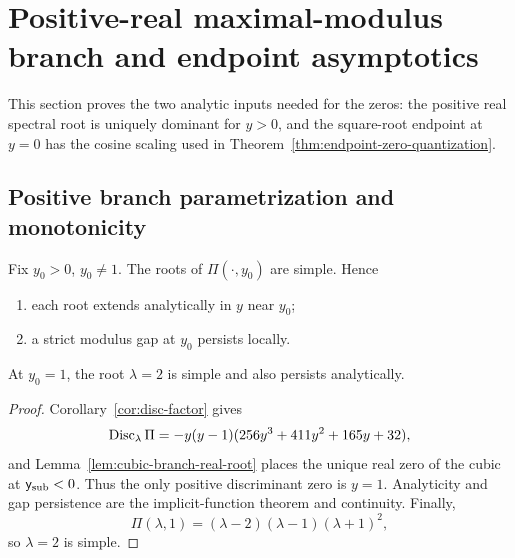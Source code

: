 \section{Positive-real maximal-modulus branch and endpoint asymptotics}\label{sec:positive-maximal-modulus-branch}

This section proves the two analytic inputs needed for the zeros: the positive real spectral root is uniquely dominant for $y>0$, and the square-root endpoint at $y=0$ has the cosine scaling used in Theorem~\ref{thm:endpoint-zero-quantization}.

\subsection{Positive branch parametrization and monotonicity}\label{subsec:positive-branch-parametrization}

\begin{lemma}\label{lem:local-simplicity-persistence}
Fix $y_0>0$, $y_0\ne1$.  The roots of $\Pi(\cdot,y_0)$ are simple.  Hence
\begin{enumerate}
\item\label{item:local-analyticity} each root extends analytically in $y$ near $y_0$;
\item\label{item:local-persistence} a strict modulus gap at $y_0$ persists locally.
\end{enumerate}
At $y_0=1$, the root $\lambda=2$ is simple and also persists analytically.
\end{lemma}
\begin{proof}
Corollary~\ref{cor:disc-factor} gives
\[
\operatorname{Disc}_\lambda\Pi=-y(y-1)(256y^3+411y^2+165y+32),
\]
and Lemma~\ref{lem:cubic-branch-real-root} places the unique real zero of the cubic at $\mathsf{y}_{\mathrm{sub}}<0$.  Thus the only positive discriminant zero is $y=1$.  Analyticity and gap persistence are the implicit-function theorem and continuity.  Finally,
\[
\Pi(\lambda,1)=(\lambda-2)(\lambda-1)(\lambda+1)^2,
\]
so $\lambda=2$ is simple.\label{rem:y1-reducible}
\end{proof}

